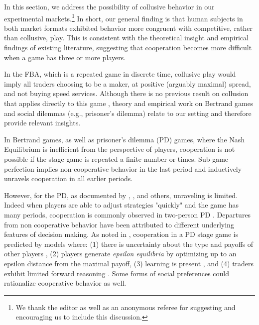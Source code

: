 \documentclass[12pt]{article}
\begin{document}
\begin{appendices}
In this section, we address the possibility of collusive behavior in our experimental markets.\footnote{We thank the editor as well as an anonymous referee for suggesting and encouraging us to include this discussion.} In short, our general finding is that human subjects in both market formats exhibited behavior more congruent with competitive, rather than collusive, play. This is consistent with the theoretical insight and empirical findings of existing literature, suggesting that cooperation becomes more difficult when a game has three or more players.

In the FBA, which is a repeated game in discrete time, collusive play would imply all traders choosing to be a maker, at positive (arguably maximal) spread, and not buying speed services. Although there is no previous result on collusion that applies directly to this game \citetext{\citealp{Budish2015} focused only on the pure-strategy, instantaneous Nash Equilibrium}, theory and empirical work on Bertrand games and social dilemmas (e.g., prisoner's dilemma) relate to our setting and therefore provide relevant insights.

In Bertrand games, as well as prisoner's dilemma (PD) games, where the Nash Equilibrium is inefficient from the perspective of players, cooperation is not possible if the stage game is repeated a finite number or times. Sub-game perfection implies non-cooperative behavior in the last period and inductively unravels cooperation in all earlier periods. 

However, for the PD, as documented by \citet{Selten1986}, \citet{Friedman2012}, \citet{Embrey2018} and others, unraveling is limited. Indeed when players are able to adjust strategies "quickly" and the game has many periods, cooperation is commonly observed in two-person PD \citep{Friedman2012,Embrey2018}. Departures from non cooperative behavior have been attributed to different underlying features of decision making. As noted in \citet{Embrey2018}, cooperation in a PD stage game is predicted by models where: (1) there is uncertainty about the type and payoffs of other players \citep{Kreps1982}, (2) players generate \textit{epsilon equilibria} \citep{Radner1986,Friedman2012} by optimizing up to an epsilon distance from the maximal payoff, (3) learning is present \citep{Mengel2014}, and (4) traders exhibit limited forward reasoning \citep{Mantovani2016}. Some forms of social preferences could rationalize cooperative behavior as well. 


\end{appendices}
\end{document}
